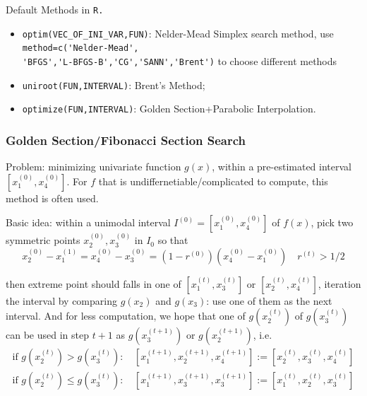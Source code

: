     
\begin{point}
    Default Methods in \lstinline|R.| 
\end{point}
\begin{itemize}[topsep=2pt,itemsep=0pt]
    \item \lstinline|optim(VEC_OF_INI_VAR,FUN)|: Nelder-Mead Simplex search method, use \lstinline|method=c('Nelder-Mead',|\\\lstinline|'BFGS','L-BFGS-B','CG','SANN','Brent')| to choose different methods
    \item \lstinline|uniroot(FUN,INTERVAL)|: Brent's Method;
    \item \lstinline|optimize(FUN,INTERVAL)|: Golden Section+Parabolic Interpolation.
\end{itemize}

    





\subsubsection{Golden Section/Fibonacci Section Search}
    \hypertarget{GoldenSection}{Problem}: minimizing univariate function $ g(x) $, within a pre-estimated interval $ [x_1^{(0)},x_4^{(0)}] $. For $ f $ that is undiffernetiable/complicated to compute, this method is often used. 

    Basic idea: within a unimodal interval $ I^{(0)}=[x_1^{(0)},x_4^{(0)}] $ of $ f(x) $, pick two symmetric points $ x_2^{(0)},x_3^{(0)} $ in $ I_0 $ so that 
\begin{equation}\label{EqaRExpressionInGolden}
    x_2^{(0)}-x_1^{(1)}=x_4^{(0)}-x_3^{(0)}=(1- r^{(0)})(x_4^{(0)}-x_1^{(0)}) \quad  r^{(t)}>1/2
\end{equation}
    
    then extreme point should falls in one of $ [x^{(t)}_1,x^{(t)}_3] $ or $ [x^{(t)}_2,x^{(t)}_4] $, iteration the interval by comparing $ g(x_2) $ and $ g(x_3) $: use one of them as the next interval. And for less computation, we hope that one of $ g(x_2^{(t)}) $ of $ g(x_3^{(t)}) $ can be used in step $ t+1 $ as $ g(x_3^{(t+1)}) $ or $ g(x_2^{(t+1)}) $, i.e.
    \begin{align}
        \text{if }g(x_2^{(t)})>g(x_3^{(t)}):&\, [x_1^{(t+1)},x_2^{(t+1)},x_4^{(t+1)}]:= [x_2^{(t)},x_3^{(t)},x_4^{(t)}]\\
        \text{if }g(x_2^{(t)})\leq g(x_3^{(t)}):&\, [x_1^{(t+1)},x_3^{(t+1)},x_3^{(t+1)}]:= [x_1^{(t)},x_2^{(t)},x_3^{(t)}]
        \end{align}



